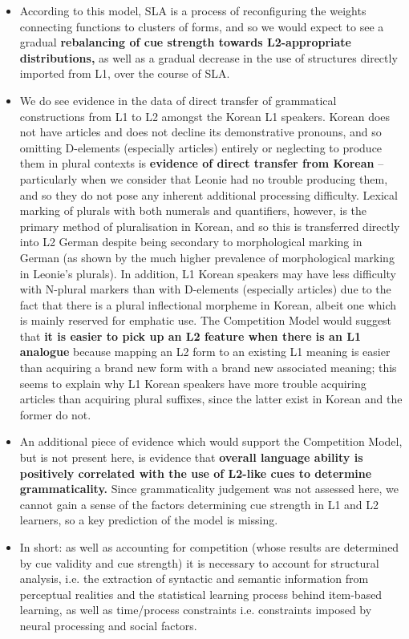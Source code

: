 \documentclass{article}
\begin{document}
\begin{itemize}
    \item According to this model, SLA is a process of reconfiguring the weights connecting functions to clusters of forms, and so we would expect to see a gradual \textbf{rebalancing of cue strength towards L2-appropriate distributions,} as well as a gradual decrease in the use of structures directly imported from L1, over the course of SLA.
    \item We do see evidence in the data of direct transfer of grammatical constructions from L1 to L2 amongst the Korean L1 speakers. Korean does not have articles and does not decline its demonstrative pronouns, and so omitting D-elements (especially articles) entirely or neglecting to produce them in plural contexts is \textbf{evidence of direct transfer from Korean} – particularly when we consider that Leonie had no trouble producing them, and so they do not pose any inherent additional processing difficulty. Lexical marking of plurals with both numerals and quantifiers, however, is the primary method of pluralisation in Korean, and so this is transferred directly into L2 German despite being secondary to morphological marking in German (as shown by the much higher prevalence of morphological marking in Leonie’s plurals). In addition, L1 Korean speakers may have less difficulty with N-plural markers than with D-elements (especially articles) due to the fact that there is a plural inflectional morpheme in Korean, albeit one which is mainly reserved for emphatic use. The Competition Model would suggest that \textbf{it is easier to pick up an L2 feature when there is an L1 analogue} because mapping an L2 form to an existing L1 meaning is easier than acquiring a brand new form with a brand new associated meaning; this seems to explain why L1 Korean speakers have more trouble acquiring articles than acquiring plural suffixes, since the latter exist in Korean and the former do not.
    \item An additional piece of evidence which would support the Competition Model, but is not present here, is evidence that \textbf{overall language ability is positively correlated with the use of L2-like cues to determine grammaticality.} Since grammaticality judgement was not assessed here, we cannot gain a sense of the factors determining cue strength in L1 and L2 learners, so a key prediction of the model is missing.
    \item In short: as well as accounting for competition (whose results are determined by cue validity and cue strength) it is necessary to account for structural analysis, i.e. the extraction of syntactic and semantic information from perceptual realities and the statistical learning process behind item-based learning, as well as time/process constraints i.e. constraints imposed by neural processing and social factors.

\end{itemize}
\end{document}
